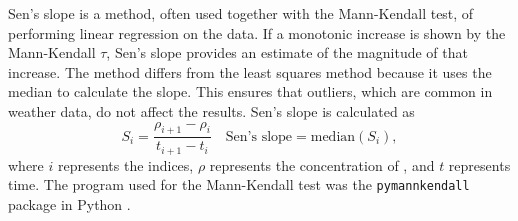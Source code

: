 Sen's slope is a method, often used together with the Mann-Kendall test, of performing linear regression on the data. If a monotonic increase is shown by the Mann-Kendall $\tau$, Sen's slope provides an estimate of the magnitude of that increase. The method differs from the least squares method because it uses the median to calculate the slope. This ensures that outliers, which are common in weather data, do not affect the results. Sen's slope is calculated as 
\begin{equation}
    S_{i} = \frac{\rho_{i+1} - \rho_i}{t_{i+1} - t_i} \quad \text{Sen's slope} = \text{median}(S_{i}),
    \label{eq:Senslope}
\end{equation}
where $i$ represents the indices, $\rho$ represents the concentration of \PM, and $t$ represents time. The program used for the Mann-Kendall test was the \texttt{pymannkendall} package in Python \cite{hussainmd.PyMannKendallPythonPackage2019}.
